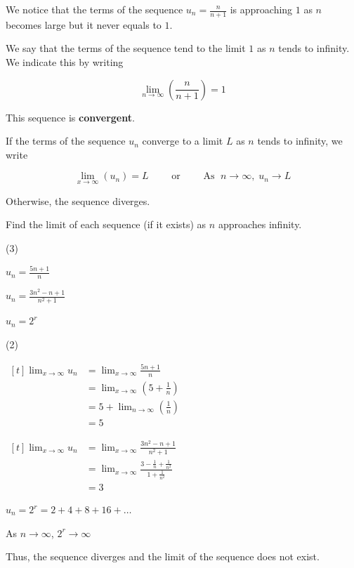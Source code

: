 \documentclass[11pt,a4paper]{book}
\begin{document}
We notice that the terms of the sequence ${\displaystyle u_{n}=\frac{n}{n+1}}$
is approaching $1$ as $n$ becomes large but it never equals to $1$.

We say that the terms of the sequence tend to the limit $1$ as $n$
tends to infinity. We indicate this by writing

\[
\lim_{n\to\infty}\left(\frac{n}{n+1}\right)=1
\]

This sequence is \textbf{convergent}.

\begin{tcolorbox}[colback=blue!5, colframe=black,boxrule=.4pt, sharpish corners]

If the terms of the sequence $u_{n}$ converge to a limit $L$ as
$n$ tends to infinity, we write

\[
\lim_{x\to\infty}\left(u_{n}\right)=L\qquad\text{ or }\qquad\text{As }\;n\to\infty,\;u_{n}\to L
\]

Otherwise, the sequence diverges.
\end{tcolorbox}

\begin{example}

Find the limit of each sequence (if it exists) as $n$ approaches
infinity.

\begin{tasks}[label=(\alph*),label-width=3.5ex](3)  

\task  ${\displaystyle u_{n}=\frac{5n+1}{n}}$

\task  ${\displaystyle u_{n}=\frac{3n^{2}-n+1}{n^{2}+1}}$

\task  $u_{n}=2^{r}$

\end{tasks}

\Solution

\begin{tasks}[label=(\alph*),label-width=3.5ex](2)  

\task  
$
\begin{aligned}[t]
\lim_{x\to\infty}u_{n} & =\lim_{x\to\infty}\frac{5n+1}{n}\\
 & =\lim_{x\to\infty}\left(5+\frac{1}{n}\right)\\
 & =5+\lim_{n\to\infty}\left(\frac{1}{n}\right)\\
 & =5
\end{aligned}
$

\task  
$
\begin{aligned}[t]
\lim_{x\to\infty}u_{n} & =\lim_{x\to\infty}\frac{3n^{2}-n+1}{n^{2}+1}\\
 & =\lim_{x\to\infty}\frac{3-\frac{1}{n}+\frac{1}{n^{2}}}{1+\frac{1}{n^{2}}}\\
 & =3
\end{aligned}
$

\task* $u_{n}=2^{r}=2+4+8+16+\ldots$

As $n\to\infty$, $2^{r}\to\infty$

Thus, the sequence diverges and the limit of the sequence does not
exist.

\end{tasks}

\end{example}
\end{document}

